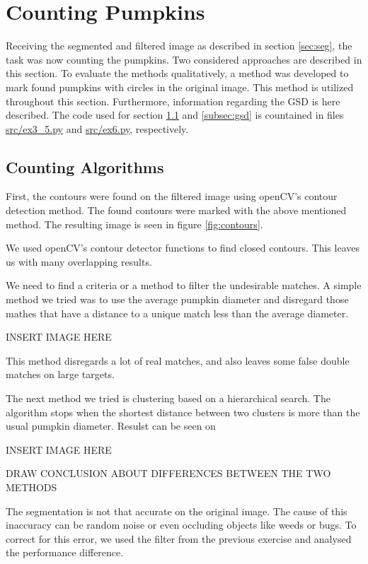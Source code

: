 \documentclass[../Head/Main.tex]{subfiles}
\begin{document}
\section{Counting Pumpkins}\label{sec:counting}
Receiving the segmented and filtered image as described in section \ref{sec:seg}, the task was now counting the pumpkins. Two considered approaches are described in this section. To evaluate the methods qualitatively, a method was developed to mark found pumpkins with circles in the original image. This method is utilized throughout this section. Furthermore, information regarding the GSD is here described. The code used for section \ref{subsec:algorithms} and \ref{subsec:gsd} is countained in files \url{src/ex3_5.py} and \url{src/ex6.py}, respectively.

\subsection{Counting Algorithms}\label{subsec:algorithms}
First, the contours were found on the filtered image using openCV's contour detection method. The found contours were marked with the above mentioned method. The resulting image is seen in figure \ref{fig:contours}.



We used openCV's contour detector functions to find closed contours.
This leaves us with many overlapping results.

We need to find a criteria or a method to filter the undesirable matches. A simple method we tried was to use the average pumpkin diameter and disregard those mathes that have a distance to a unique match less than the average diameter.

INSERT IMAGE HERE

This method disregards a lot of real matches, and also leaves some false double matches on large targets.

The next method we tried is clustering based on a hierarchical search. The algorithm stops when the shortest distance between two clusters is more than the usual pumpkin diameter. Resulst can be seen on

INSERT IMAGE HERE

DRAW CONCLUSION ABOUT DIFFERENCES BETWEEN THE TWO METHODS

The segmentation is not that accurate on the original image. The cause of this inaccuracy can be random noise or even occluding objects like weeds or bugs. To correct for this error, we used the filter from the previous exercise and analysed the performance difference.
\end{document}
